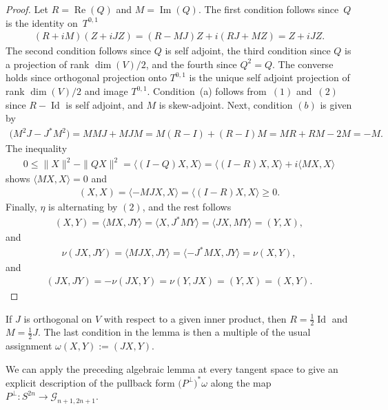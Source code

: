 \documentclass[10pt,a4paper]{amsart}
\numberwithin{equation}{section}
\newcommand{\cG}{{\mathcal G}}
\begin{document}
\begin{proof} Let $R = \operatorname{Re}(Q)$ and $M = \operatorname{Im}(Q)$. The first condition follows since~$Q$ is the identity on~$T^{0,1}$
\begin{gather*}
(R+iM)(Z+iJZ) = (R-MJ)Z + i(RJ+MZ) = Z+iJZ.
\end{gather*}
The second condition follows since $Q$ is self adjoint, the third condition since $Q$ is a projection of rank $\dim(V)/2$, and the fourth since $Q^2 = Q$. The converse holds since orthogonal projection onto $T^{0,1}$ is the unique self adjoint projection of rank $\dim(V)/2$ and image $T^{0,1}$. Condition~(a) follows from~$(1)$ and~$(2)$ since $R-\operatorname{Id}$ is self adjoint, and $M$ is skew-adjoint. Next, condition $(b)$ is given by
\begin{gather*}
\big(M^2J-J^*M^2) = MMJ+MJM = M(R-I)+(R-I)M = MR+RM-2M = -M.
\end{gather*}
The inequality
\begin{gather*}
0 \leq \|X\|^2 - \|Q X\|^2 = \langle (I-Q)X, X \rangle = \langle (I-R)X, X \rangle + i \langle MX , X\rangle
\end{gather*}
shows $\langle MX , X\rangle =0$ and
\begin{gather*}
 (X,X) = \langle -MJ X, X \rangle = \langle (I-R)X, X \rangle \geq 0.
\end{gather*}
Finally, $\eta$ is alternating by $(2)$, and the rest follows
\begin{gather*}
(X,Y) = \langle M X, JY\rangle = \langle X, J^*M Y\rangle = \langle JX, MY\rangle = (Y,X),
\end{gather*}
and
\begin{gather*}
 \nu(JX,JY) = \langle M JX, JY\rangle = \langle - J^* M X, JY\rangle = \nu(X,Y) ,
\end{gather*}
and
\begin{gather*}
(JX,JY) = -\nu(JX,Y)= \nu(Y,JX)= (Y,X) = (X,Y).\tag*{\qed}
 \end{gather*}
 \renewcommand{\qed}{}
\end{proof}

\begin{ex} \label{ex;MonehalfJ} If $J$ is orthogonal on $V$ with respect to a given inner product, then $R= \frac 1 2 \operatorname{Id} $ and $M = \frac 1 2 J$. The last condition in the lemma is then a multiple of the usual assignment $\omega(X,Y) := (J X,Y)$.
 \end{ex}

We can apply the preceding algebraic lemma at every tangent space to give an explicit description of the pullback form $\big(P^\perp\big)^*\omega$ along the map $P^\perp\colon S^{2n} \to \cG_{n+1,2n+1}$.
\end{document}

